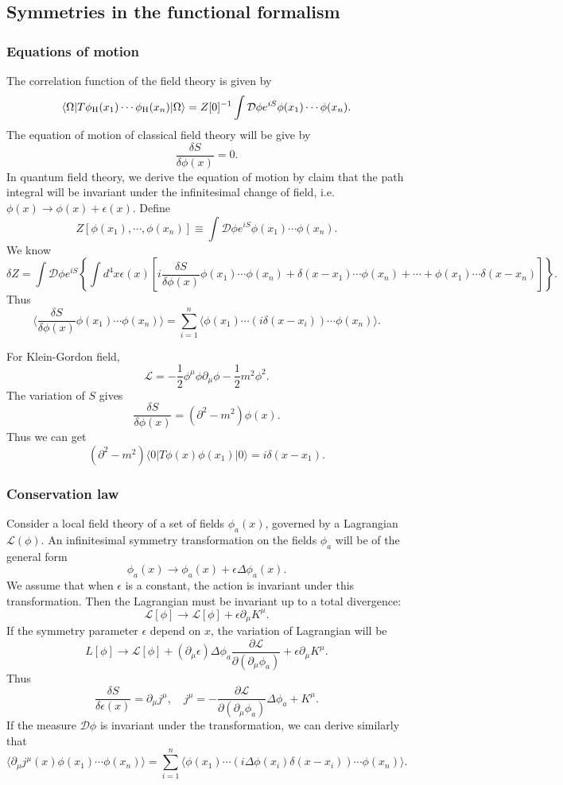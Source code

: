 \subsection{Symmetries in the functional formalism}
\subsubsection{Equations of motion}
\noindent
The correlation function of the field theory is given by
\[\langle \Omega | T \phi_{\rm H}(x_1) \cdots \phi_{\rm H}(x_n) | \Omega \rangle = Z[0]^{-1} \int \mathcal{D}\phi e^{iS} \phi(x_1)\cdots\phi(x_n).\]
The equation of motion of classical field theory will be give by
\[\frac{\delta S}{\delta \phi(x)} = 0.\]
In quantum field theory, we derive the equation of motion by claim that the path integral will be invariant under the infinitesimal change of field, i.e. $\phi(x) \to \phi(x) + \epsilon(x)$.
Define
\[Z[\phi(x_1),\cdots,\phi(x_n)] \equiv  \int \mathcal{D}\phi e^{iS} \phi(x_1)\cdots\phi(x_n).\]
We know
\[\delta Z = \int \mathcal{D}\phi e^{iS} \left\{ \int d^4x \epsilon(x) \left[ i\frac{\delta S}{\delta \phi(x)} \phi(x_1)\cdots\phi(x_n) + \delta(x-x_1)\cdots\phi(x_n) + \cdots + \phi(x_1)\cdots\delta(x-x_n) \right]\right\} .\]
Thus
\[\langle \frac{\delta S}{\delta \phi(x)} \phi(x_1)\cdots\phi(x_n) \rangle  = \sum_{i=1}^{n} \langle \phi(x_1) \cdots (i\delta(x-x_i)) \cdots \phi(x_n) \rangle.\]
\begin{example}
For Klein-Gordon field,
\[\mathcal{L} = -\frac{1}{2}\phi^{\mu}\phi \partial_{\mu}\phi - \frac{1}{2}m^2\phi^2.\]
The variation of $S$ gives
\[\frac{\delta S}{\delta \phi(x)} = (\partial^2-m^2)\phi(x).\]
Thus we can get
\[(\partial^2-m^2) \langle 0 | T \phi(x)\phi(x_1)| 0 \rangle = i\delta(x-x_1).\]
\end{example}

\subsubsection{Conservation law}
Consider a local field theory of a set of fields $\phi_a(x)$, governed by a Lagrangian $\mathcal{L}(\phi)$. An infinitesimal symmetry transformation on the fields $\phi_a$ will be of the general form 
\[\phi_a(x) \to \phi_a(x) + \epsilon \Delta \phi_a(x).\]
We assume that when $\epsilon$ is a constant, the action is invariant under this transformation. Then the Lagrangian must be invariant up to a total divergence:
\[\mathcal{L}[\phi] \to \mathcal{L}[\phi] + \epsilon \partial_{\mu} K^{\mu}.\]
If the symmetry parameter $\epsilon$ depend on $x$, the variation of Lagrangian will be
\[L[\phi] \to \mathcal{L}[\phi] + (\partial_{\mu}\epsilon)\Delta \phi_a \frac{\partial \mathcal{L}}{\partial (\partial_{\mu}\phi_a)} + \epsilon \partial_{\mu} K^{\mu}.\]
Thus
\[\frac{\delta S}{\delta \epsilon(x)} = \partial_{\mu} j^{\mu} , \quad j^{\mu} = -\frac{\partial \mathcal{L}}{\partial (\partial_{\mu}\phi_a)}\Delta \phi_a + K^{\mu} .\]
If the measure $\mathcal{D}\phi$ is invariant under the transformation, we can derive similarly that
\[\langle \partial_{\mu} j^{\mu}(x) \phi(x_1)\cdots\phi(x_n) \rangle  = \sum_{i=1}^{n} \langle \phi(x_1) \cdots (i\Delta \phi(x_i)\delta(x-x_i)) \cdots \phi(x_n) \rangle.\]

